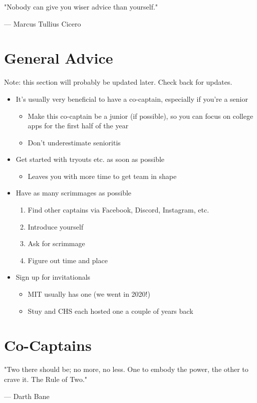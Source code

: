 \documentclass[11pt, letterpaper]{article}
\begin{document}
\newpage

\epigraph{"Nobody can give you wiser advice than yourself."}{--- \textup{Marcus Tullius Cicero}}

\section{General Advice}

Note: this section will probably be updated later. Check back for updates.

\begin{itemize}
    \item It’s usually very beneficial to have a co-captain, especially if you're a senior
    \begin{itemize}
        \item Make this co-captain be a junior (if possible), so you can focus on college apps for the first half of the year
        \item Don't underestimate senioritis
    \end{itemize}
    \item Get started with tryouts etc. as soon as possible
    \begin{itemize}
        \item Leaves you with more time to get team in shape
    \end{itemize}
    \item Have as many scrimmages as possible
    \begin{enumerate}
        \item Find other captains via Facebook, Discord, Instagram, etc.
        \item Introduce yourself
        \item Ask for scrimmage
        \item Figure out time and place
    \end{enumerate}
    \item Sign up for invitationals
    \begin{itemize}
        \item MIT usually has one (we went in 2020!)
        \item Stuy and CHS each hosted one a couple of years back
    \end{itemize}
\end{itemize}

\newpage

\section{Co-Captains}
\epigraph{"Two there should be; no more, no less. One to embody the power, the other to crave it. The Rule of Two." }{--- \textup{Darth Bane}}
\end{document}

